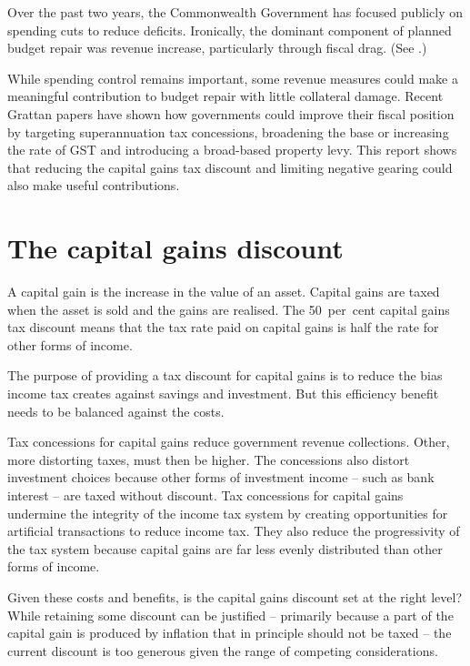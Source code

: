 Over the past two years, the Commonwealth Government has focused publicly on spending cuts to reduce deficits. Ironically, the dominant component of planned budget repair was revenue increase, particularly through fiscal drag. (See .) %
 
While spending control remains important, some revenue measures could make a meaningful contribution to budget repair with little collateral damage. Recent Grattan papers have shown how governments could improve their fiscal position by targeting superannuation tax concessions, broadening the base or increasing the rate of GST and introducing a broad-based property levy. This report shows that reducing the capital gains tax discount and limiting negative gearing could also make useful contributions.


\chapter{The capital gains discount}\label{chapter:The-capital-gains-discount}
A capital gain is the increase in the value of an asset. Capital gains are taxed when the asset is sold and the gains are realised. The 50~per~cent capital gains tax discount means that the tax rate paid on capital gains is half the rate for other forms of income. 

The purpose of providing a tax discount for capital gains is to reduce the bias income tax creates against savings and investment. But this efficiency benefit needs to be balanced against the costs. 

Tax concessions for capital gains reduce government revenue collections. Other, more distorting taxes, must then be higher. The concessions also distort investment choices because other forms of investment income – such as bank interest – are taxed without discount. Tax concessions for capital gains undermine the integrity of the income tax system by creating opportunities for artificial transactions to reduce income tax. They also reduce the progressivity of the tax system because capital gains are far less evenly distributed than other forms of income. 

Given these costs and benefits, is the capital gains discount set at the right level? While retaining some discount can be justified – primarily because a part of the capital gain is produced by inflation that in principle should not be taxed – the current discount is too generous given the range of competing considerations.

